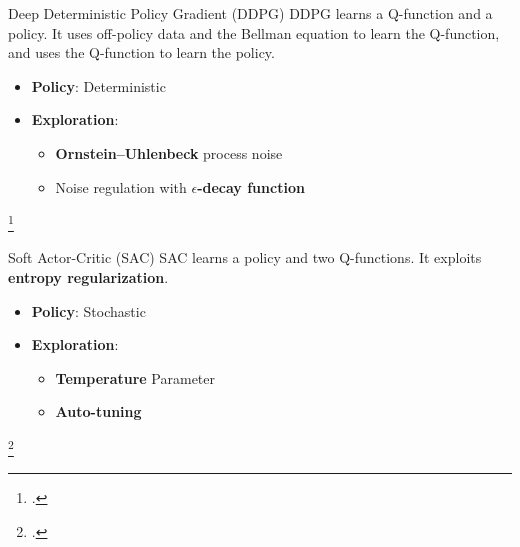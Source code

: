 \documentclass[aspectratio=169]{beamer}
\begin{document}
\begin{frame}{Deep Deterministic Policy Gradient (DDPG)}
	\centering
	\onslide<5>{}
	DDPG learns a Q-function and a policy. It uses off-policy data and the Bellman equation to learn the Q-function, and uses the Q-function to learn the policy.
	\begin{itemize}[<+- | alert@+>]
		\item \textbf{Policy}: Deterministic
		\item \textbf{Exploration}: \begin{itemize}
			      \item \textbf{Ornstein–Uhlenbeck} process noise
			      \item Noise regulation with \textbf{$\epsilon$-decay function}
		      \end{itemize}
	\end{itemize}
	\footcite*{lillicrap2015continuous}
\end{frame}

\begin{frame}{Soft Actor-Critic (SAC)}
	\onslide<5>{}
	SAC learns a policy and two Q-functions. It exploits \textbf{entropy regularization}. 
	\centering
	\begin{itemize}[<+- | alert@+>]
		\item \textbf{Policy}: Stochastic
		\item \textbf{Exploration}: \begin{itemize}[<+- | alert@+>]
			      \item \textbf{Temperature} Parameter
			      \item \textbf{Auto-tuning}
		      \end{itemize}
	\end{itemize}
	\footcite*{haarnoja2018alg}
\end{frame}
\end{document}
